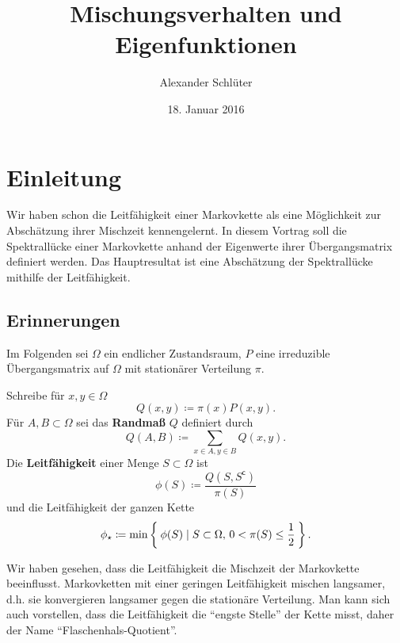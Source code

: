 \documentclass[ngerman,a4paper,11pt]{scrartcl}
\newcommand{\stcomp}[1]{{#1}^{\mathsf{c}}} %
\begin{document}
\title{Mischungsverhalten und Eigenfunktionen}
\author{Alexander Schlüter}
\date{18. Januar 2016}
\maketitle

\section{Einleitung}
Wir haben schon die Leitfähigkeit einer Markovkette als eine Möglichkeit zur
Abschätzung ihrer Mischzeit kennengelernt. In diesem Vortrag soll die
Spektrallücke einer Markovkette anhand der Eigenwerte ihrer Übergangsmatrix
definiert werden. Das Hauptresultat ist eine Abschätzung der Spektrallücke
mithilfe der Leitfähigkeit.

\subsection{Erinnerungen}
Im Folgenden sei $\Omega$ ein endlicher Zustandsraum, $P$ eine irreduzible Übergangsmatrix auf $\Omega$ mit stationärer Verteilung $\pi$.
\begin{defn}
 Schreibe für $x, y\in\Omega$ 
 \begin{equation*}
  Q(x,y)\coloneqq\pi(x)P(x,y).
 \end{equation*}
 Für $A, B\subset\Omega$ sei das \textbf{Randmaß} $Q$ definiert durch
 \begin{equation*}
   Q(A,B)\coloneqq\sum_{x\in A, y\in B}Q(x,y). 
 \end{equation*}
 Die \textbf{Leitfähigkeit} einer Menge $S\subset\Omega$ ist
 \begin{equation*}
  \phi(S)\coloneqq\frac{Q(S,\stcomp{S})}{\pi(S)} 
 \end{equation*}
 und die Leitfähigkeit der ganzen Kette
 \begin{equation*}
  \phi_\star\coloneqq\min\Set{\phi(S)\mid S\subset\Omega,\,0<\pi(S)\leq\frac{1}{2}}.
 \end{equation*}
\end{defn}
Wir haben gesehen, dass die Leitfähigkeit die Mischzeit der Markovkette
beeinflusst. Markovketten mit einer geringen Leitfähigkeit mischen langsamer,
d.h. sie konvergieren langsamer gegen die stationäre Verteilung. Man kann sich
auch vorstellen, dass die Leitfähigkeit die ``engste Stelle'' der Kette misst,
daher der Name ``Flaschenhals-Quotient''.
\end{document}
